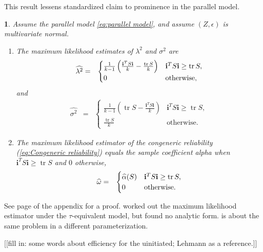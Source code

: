 \documentclass{article}
\makeatletter
\theoremstyle{plain}
\newtheorem{thm}{\protect\theoremname}
\theoremstyle{plain}
\theoremstyle{definition}
\theoremstyle{remark}
\theoremstyle{definition}
\theoremstyle{plain}
\theoremstyle{plain}
\theoremstyle{definition}
\newenvironment{proof}[1][\protect\proofname]{\par
	\normalfont\topsep6\p@\@plus6\p@\relax
	\trivlist
	\itemindent\parindent
	\item[\hskip\labelsep\scshape #1]\ignorespaces
}{%
	\endtrivlist\@endpefalse
}
\providecommand{\proofname}{Proof}
\providecommand{\theoremname}{Theorem}
\DeclareMathOperator{\tr}{tr}
\makeatother
\begin{document}
This result lessens standardized claim to prominence in the parallel model.

\begin{thm}\label{thm:ML}
Assume the parallel model \eqref{eq:parallel model}, and assume $(Z,\epsilon)$ is multivariate normal. 
\begin{enumerate}[label=(\roman*)]
\item The maximum likelihood estimates of $\lambda^{2}$
and $\sigma^{2}$ are 
\begin{eqnarray*}
\widehat{\lambda^{2}} & = & \begin{cases}
\frac{1}{k-1}\left(\frac{\mathbf{i}^{T}S\mathbf{i}}{k}-\frac{\tr{S}}{k}\right) & \mathbf{i}^{T}S\mathbf{i}\geq\tr{S},\\
0 & \text{\textrm{otherwise}},
\end{cases}\\
\end{eqnarray*}
and
\begin{eqnarray*}
\widehat{\sigma^{2}} & = & \begin{cases}
\frac{1}{k-1}\left(\tr{S}-\frac{\mathbf{i}^{T}S\mathbf{i}}{k}\right) & \mathbf{i}^{T}S\mathbf{i}\geq\tr{S},\\
\frac{\tr{S}}{k} & \textrm{otherwise}.
\end{cases}
\end{eqnarray*}
\item The maximum likelihood estimator of the congeneric reliability
(\ref{eq:Congeneric reliability}) equals the sample coefficient alpha
when $\mathbf{i}^{T}S\mathbf{i}\geq\tr{S}$ and $0$ otherwise,
\begin{eqnarray*}
\widehat{\omega} & = & \begin{cases}
\widehat{\alpha}(S) & \mathbf{i}^{T}S\mathbf{i}\geq\tr{S},\\
0 & \text{\textrm{otherwise}}.
\end{cases}
\end{eqnarray*}
\end{enumerate}
\end{thm}
\begin{proof}
See page \pageref{proof:ML} of the appendix for a proof. \citet[][section 3 -- 5]{Kristof1969-ou} worked out the maximum likelihood estimator under the $\tau$-equivalent model, but found no analytic form. \citep[][Exercise 3.9, p. 114]{Muirhead2009-kq} is about the same problem in a different parameterization.
\end{proof}

[[fill in: some words about efficiency for the uinitiated; Lehmann as a reference.]]
\end{document}
